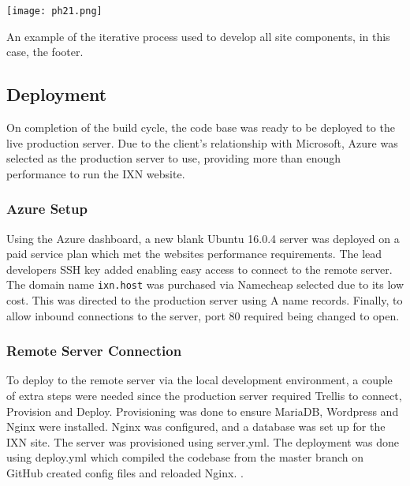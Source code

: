 \documentclass[fontsize=11pt]{extarticle}
\numberwithin{figure}{section} %
\begin{document}
\begin{table}[H]
      \centering
      \texttt{[image: ph21.png]}
      \caption{An example of the iterative process used to develop all site components, in this case, the footer.}
\label{buildcycleimg}
 \end{table}

\hypertarget{deployment}{%
\subsection{Deployment}\label{deployment}}

On completion of the build cycle, the code base was ready to be deployed
to the live production server. Due to the client's relationship with
Microsoft, Azure was selected as the production server to use, providing
more than enough performance to run the IXN website.

\hypertarget{azure-setup}{%
\subsubsection{Azure Setup}\label{azure-setup}}

Using the Azure dashboard, a new blank Ubuntu 16.0.4 server was deployed
on a paid service plan which met the websites performance requirements.
The lead developers SSH key added enabling easy access to connect to the
remote server. The domain name \texttt{ixn.host} was purchased via
Namecheap selected due to its low cost. This was directed to the
production server using A name records. Finally, to allow inbound
connections to the server, port 80 required being changed to open.

\hypertarget{remote-server-connection}{%
\subsubsection{Remote Server
Connection}\label{remote-server-connection}}

To deploy to the remote server via the local development environment, a
couple of extra steps were needed since the production server required
Trellis to connect, Provision and Deploy. Provisioning was done to
ensure MariaDB, Wordpress and Nginx were installed. Nginx was
configured, and a database was set up for the IXN site. The server was
provisioned using server.yml. The deployment was done using deploy.yml
which compiled the codebase from the master branch on GitHub created
config files and reloaded Nginx. \cite{p23}.
\end{document}
